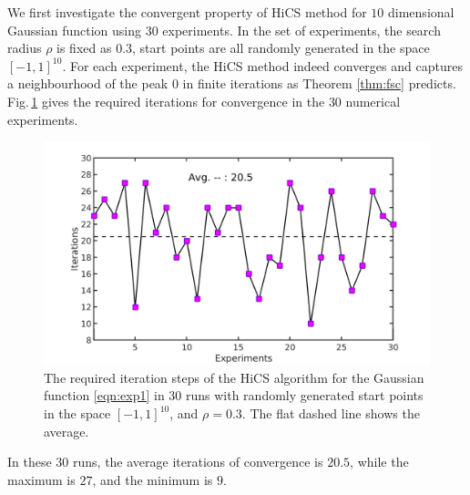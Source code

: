 \documentclass[final,1p,times]{elsarticle}
\begin{document}

We first investigate the convergent property of HiCS
method for $10$ dimensional Gaussian function using 
$30$ experiments.
In the set of experiments, the search radius $\rho$ is fixed as
$0.3$, start points are all randomly generated in the space $[-1,
1]^{10}$.  For each experiment, the HiCS method indeed converges and
captures a neighbourhood of the peak
$0$ in finite iterations as Theorem \ref{thm:fsc} predicts.
Fig.\,\ref{fig:exp1:randInit} gives the required iterations for
convergence in the $30$ numerical experiments.
\begin{figure}[!htbp]
	\centering
	  \includegraphics[scale=0.2]{../figures/gauss10Drandr0_3.png}
	  \caption{
	  The required iteration steps of the 
	  HiCS algorithm for the Gaussian function
	  \eqref{eqn:exp1} in $30$ runs with randomly generated start points
	  in the space $[-1, 1]^{10}$, and $\rho=0.3$. 
	  The flat dashed line shows the average.} 
	  \label{fig:exp1:randInit}
\end{figure}
In these $30$ runs, the average iterations of convergence is
$20.5$, while the maximum is $27$, and the minimum is $9$.

\end{document}
